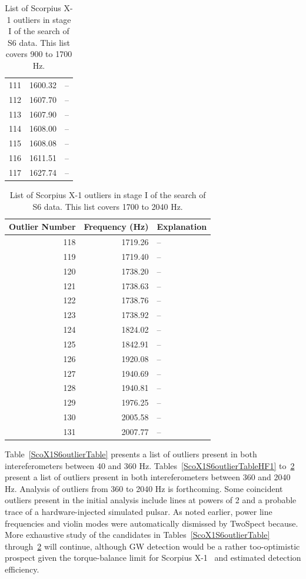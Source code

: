 \begin{table}
\begin{center}
\begin{tabular}{r r l}
111 & 1600.32 & -- \\
112 & 1607.70 & -- \\
113 & 1607.90 & -- \\
114 & 1608.00 & -- \\
115 & 1608.08 & -- \\
116 & 1611.51 & -- \\
117 & 1627.74 & -- \\
\end{tabular}
\caption{List of Scorpius X-1 outliers in stage I of the search of S6 data. This list covers 900 to 1700 Hz.}
\label{ScoX1S6outlierTableHF2}
\end{center}
\end{table}

\begin{table}
\begin{center}
\begin{tabular}{r r l}
Outlier Number & Frequency (Hz) & Explanation \\
\hline
118 & 1719.26 & -- \\
119 & 1719.40 & -- \\
120 & 1738.20 & -- \\
121 & 1738.63 & -- \\
122 & 1738.76 & -- \\
123 & 1738.92 & -- \\
124 & 1824.02 & -- \\
125 & 1842.91 & -- \\
126 & 1920.08 & -- \\
127 & 1940.69 & -- \\
128 & 1940.81 & -- \\
129 & 1976.25 & -- \\
130 & 2005.58 & -- \\
131 & 2007.77 & -- \\
\end{tabular}
\caption{List of Scorpius X-1 outliers in stage I of the search of S6 data. This list covers 1700 to 2040 Hz.}
\label{ScoX1S6outlierTableHF3}
\end{center}
\end{table}


Table~\ref{ScoX1S6outlierTable} presents a list of outliers present in both intereferometers between 40 and 360 Hz.
Tables~\ref{ScoX1S6outlierTableHF1} to~\ref{ScoX1S6outlierTableHF3} present a list of outliers present in both intereferometers between 360 and 2040 Hz.
Analysis of outliers from 360 to 2040 Hz is forthcoming.
Some coincident outliers present in the initial analysis include lines at powers of 2 and a probable trace of a hardware-injected simulated pulsar.
As noted earlier, power line frequencies and violin modes were automatically dismissed by TwoSpect because.
More exhaustive study of the candidates in Tables~\ref{ScoX1S6outlierTable} through~\ref{ScoX1S6outlierTableHF3} will continue, although GW detection would be a rather too-optimistic prospect given the torque-balance limit for Scorpius X-1~\cite{Bildsten1998} and estimated detection efficiency.


